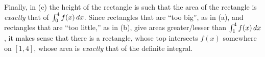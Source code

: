 \documentclass{ximera}
\begin{document}
Finally, in (c) the height of the rectangle is such that the area of
the rectangle is \textit{exactly} that of $\int_0^4 f(x)\,d x$. Since
rectangles that are ``too big'', as in (a), and rectangles that are
``too little,'' as in (b), give areas greater/lesser than $\int_1^4
f(x)\,d x$, it makes sense that there is a rectangle, whose top
intersects $f(x)$ somewhere on $[1,4]$, whose area is \textit{exactly}
that of the definite integral.
\end{document}
